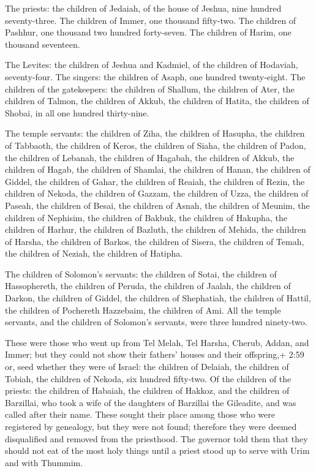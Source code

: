  The priests: the children of Jedaiah, of the house of
Jeshua, nine hundred seventy-three.  The children of Immer,
one thousand fifty-two.  The children of Pashhur, one
thousand two hundred forty-seven.  The children of Harim,
one thousand seventeen.

 The Levites: the children of Jeshua and Kadmiel, of the
children of Hodaviah, seventy-four.  The singers: the
children of Asaph, one hundred twenty-eight.  The children
of the gatekeepers: the children of Shallum, the children of Ater, the
children of Talmon, the children of Akkub, the children of Hatita, the
children of Shobai, in all one hundred thirty-nine.

 The temple servants: the children of Ziha, the children of
Hasupha, the children of Tabbaoth,  the children of Keros,
the children of Siaha, the children of Padon,  the children
of Lebanah, the children of Hagabah, the children of Akkub,
 the children of Hagab, the children of Shamlai, the
children of Hanan,  the children of Giddel, the children of
Gahar, the children of Reaiah,  the children of Rezin, the
children of Nekoda, the children of Gazzam,  the children
of Uzza, the children of Paseah, the children of Besai, 
the children of Asnah, the children of Meunim, the children of Nephisim,
 the children of Bakbuk, the children of Hakupha, the
children of Harhur,  the children of Bazluth, the children
of Mehida, the children of Harsha,  the children of Barkos,
the children of Sisera, the children of Temah,  the
children of Neziah, the children of Hatipha.

 The children of Solomon's servants: the children of Sotai,
the children of Hassophereth, the children of Peruda,  the
children of Jaalah, the children of Darkon, the children of Giddel,
 the children of Shephatiah, the children of Hattil, the
children of Pochereth Hazzebaim, the children of Ami.  All
the temple servants, and the children of Solomon's servants, were three
hundred ninety-two.

 These were those who went up from Tel Melah, Tel Harsha,
Cherub, Addan, and Immer; but they could not show their fathers' houses
and their offspring,+ 2:59 or, seed whether they were of Israel:
 the children of Delaiah, the children of Tobiah, the
children of Nekoda, six hundred fifty-two.  Of the children
of the priests: the children of Habaiah, the children of Hakkoz, and the
children of Barzillai, who took a wife of the daughters of Barzillai the
Gileadite, and was called after their name.  These sought
their place among those who were registered by genealogy, but they were
not found; therefore they were deemed disqualified and removed from the
priesthood.  The governor told them that they should not
eat of the most holy things until a priest stood up to serve with Urim
and with Thummim.

